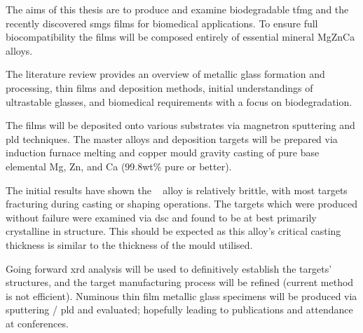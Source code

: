 \documentclass[a4paper,12pt,oneside]{report}%
\begin{document}
The aims of this thesis are to produce and examine biodegradable \gls{tfmg} and the recently discovered \glspl{smg} films for biomedical applications. To ensure full biocompatibility the films will be composed entirely of essential mineral MgZnCa alloys.

The literature review provides an overview of metallic glass formation and processing, thin films and deposition methods, initial understandings of ultrastable glasses, and biomedical requirements with a focus on biodegradation. 

The films will be deposited onto various substrates via magnetron sputtering and \gls{pld} techniques. The master alloys and deposition targets will be prepared via induction furnace melting and copper mould gravity casting of pure base elemental Mg, Zn, and Ca (99.8wt\% pure or better).

The initial results have shown the \MgZnCa~ alloy is relatively brittle, with most targets fracturing during casting or shaping operations. The targets which were produced without failure were examined via \acrshort{dsc} and found to be at best primarily crystalline in structure. This should be expected as this alloy's critical casting thickness is similar to the thickness of the mould utilised. 

Going forward \acrshort{xrd} analysis will be used to definitively establish the targets' structures, and the target manufacturing process will be refined (current method is not efficient). Numinous thin film metallic glass specimens will be produced via sputtering / \gls{pld} and evaluated; hopefully leading to publications and attendance at conferences.



\newpage
\tableofcontents\newpage
{}
\listoffigures\newpage
\listoftables\newpage
\clearpage %
\end{document}
